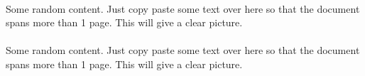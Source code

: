 \documentclass{article}
\begin{document}
    \paragraph{}
	Some random content. Just copy paste some text over here so that the document spans more than 1 page. This will give a clear picture.
    \paragraph{}
	Some random content. Just copy paste some text over here so that the document spans more than 1 page. This will give a clear picture.
\end{document}
